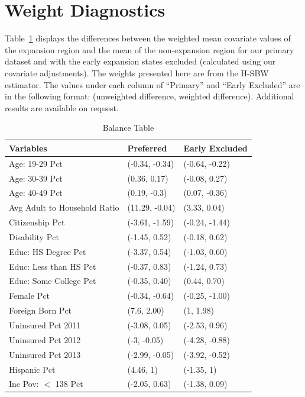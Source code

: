 \section{Weight Diagnostics}
\label{ssec:balancetables}

Table~\ref{tab:baltab1} displays the differences between the weighted mean covariate values of the expansion region and the mean of the non-expansion region for our primary dataset and with the early expansion states excluded (calculated using our covariate adjustments). The weights presented here are from the H-SBW estimator. The values under each column of ``Primary'' and ``Early Excluded'' are in the following format: (unweighted difference, weighted difference). Additional results are available on request.

\begin{table}[ht]
\centering
    \caption{Balance Table}
    \label{tab:baltab1}
\begin{tabular}{lll}
  \hline
Variables & Preferred & Early Excluded \\ 
  \hline
Age: 19-29 Pct & (-0.34, -0.34) & (-0.64, -0.22) \\ 
  Age: 30-39 Pct & (0.36, 0.17) & (-0.08, 0.27) \\ 
  Age: 40-49 Pct & (0.19, -0.3) & (0.07, -0.36) \\ 
  Avg Adult to Household Ratio & (11.29, -0.04) & (3.33, 0.04) \\ 
  Citizenship Pct & (-3.61, -1.59) & (-0.24, -1.44) \\ 
  Disability Pct & (-1.45, 0.52) & (-0.18, 0.62) \\ 
  Educ: HS Degree Pct & (-3.37, 0.54) & (-1.03, 0.60) \\ 
  Educ: Less than HS Pct & (-0.37, 0.83) & (-1.24, 0.73) \\ 
  Educ: Some College Pct & (-0.35, 0.40) & (0.44, 0.70) \\ 
  Female Pct & (-0.34, -0.64) & (-0.25, -1.00) \\ 
  Foreign Born Pct & (7.6, 2.00) & (1, 1.98) \\ 
  Uninsured Pct 2011 & (-3.08, 0.05) & (-2.53, 0.96) \\ 
  Uninsured Pct 2012 & (-3, -0.05) & (-4.28, -0.88) \\ 
  Uninsured Pct 2013 & (-2.99, -0.05) & (-3.92, -0.52) \\ 
  Hispanic Pct & (4.46, 1) & (-1.35, 1) \\ 
  Inc Pov: $<$ 138 Pct & (-2.05, 0.63) & (-1.38, 0.09) \\ 

\end{tabular}
\end{table}
